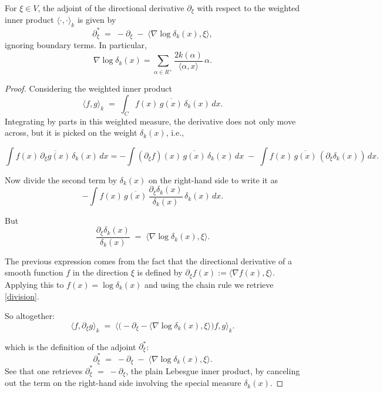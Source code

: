 \documentclass[10pt,a4paper]{amsart}
\begin{document}
\begin{proposition}\label{prop1}
For $\xi \in V$, the adjoint of the directional derivative
$\partial_\xi$ with respect to the weighted inner product
$\langle \cdot , \cdot \rangle_k$ is given by
\[
  \partial_\xi^{*} \;=\; -\partial_\xi \;-\; \langle \nabla \log \delta_k(x), \xi \rangle ,
\]
ignoring boundary terms. In particular,
\[
  \nabla \log \delta_k(x) = \sum_{\alpha \in R^+} 
  \frac{2k(\alpha)}{\langle \alpha, x\rangle}\,\alpha .
\]

\end{proposition}

\begin{proof}
Considering the weighted inner product
\[
  \langle f,g \rangle_k
  \;=\;
  \int_C f(x)\,\overline{g(x)}\,\delta_k(x)\,dx .
\]
\noindent
Integrating by parts in this weighted measure, the derivative does not only move across, but it is picked on the weight \(\delta_k(x)\), i.e., 

\[
  \int f(x)\,\overline{\partial_\xi g(x)}\,\delta_k(x)\,dx  = -\int (\partial_\xi f)(x)\,\overline{g(x)}\,\delta_k(x)\,dx
    \;-\; \int f(x)\,\overline{g(x)}\,(\partial_\xi \delta_k(x))\,dx .
\]



Now divide the second term by \(\delta_k(x)\) on the right-hand side to write it as
\[
  - \int f(x)\,\overline{g(x)}\,
     \frac{\partial_\xi \delta_k(x)}{\delta_k(x)}\,\delta_k(x)\,dx .
\]

But
\begin{equation}\label{division}
  \frac{\partial_\xi \delta_k(x)}{\delta_k(x)}
  \;=\; \langle \nabla \log \delta_k(x), \xi \rangle.
\end{equation}

The previous expression comes from the fact that the directional derivative of a smooth function $f$ in the direction $\xi$ is defined by $\partial_\xi f(x) := \langle \nabla f(x), \xi \rangle$. Applying this to $f(x) = \log \delta_k(x)$ and using the chain rule  we retrieve \eqref{division}.



So altogether:
\[
  \langle f, \partial_\xi g \rangle_k
  \;=\;
  \langle \big(-\partial_\xi - \langle \nabla \log \delta_k(x), \xi \rangle\big) f , g \rangle_k .
\]

which is the definition of the adjoint \(\partial_\xi^*\):
\begin{equation}\label{defadjoint}
  \partial_\xi^* \;=\; -\partial_\xi \;-\; \langle \nabla \log \delta_k(x), \xi \rangle .
\end{equation}
See that one retrieves $\partial_{\xi}^{*} \;=\; -\partial_{\xi}$, the plain Lebesgue inner product, by canceling out the term on the right-hand side involving the special measure $\delta_k(x).$



\end{proof}
\end{document}
